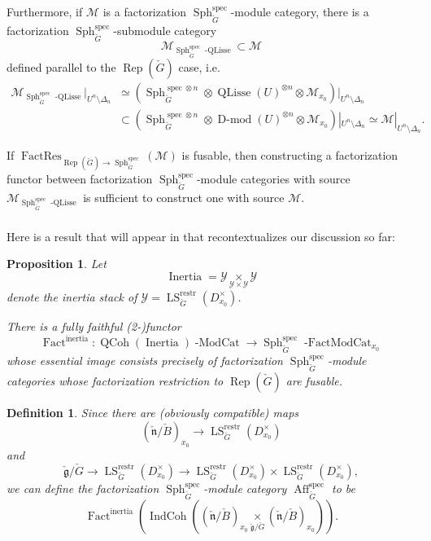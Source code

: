 \documentclass[10pt]{amsart}
\newtheorem{prop}[subsubsection]{Proposition}
\newtheorem{defn}[subsubsection]{Definition}
\theoremstyle{remark}
\newcommand{\on}[1]{\operatorname{#1}}
\newcommand{\Dmod}{\on{D-mod}}
\newcommand{\Gcheck}{\check{G}}
\newcommand{\gcheck}{\check{\mathfrak{g}}}
\newcommand{\ncheck}{\check{\mathfrak{n}}}
\newcommand{\Bcheck}{\check{B}}
\newcommand{\sssec}[1]{\subsubsection{}}
\begin{document}
\sssec{}
Furthermore, if $\mathcal{M}$ is a factorization $\on{Sph}_{\Gcheck}^{\on{spec}}$-module category, there is a factorization $\on{Sph}_{\Gcheck}^{\on{spec}}$-submodule category
$$
\mathcal{M}_{\on{Sph}_{\Gcheck}^{\on{spec}}\on{-QLisse}} \subset \mathcal{M}
$$
defined parallel to the $\on{Rep}(\Gcheck)$ case, i.e.
\begin{align}
\mathcal{M}_{\on{Sph}_{\Gcheck}^{\on{spec}}\on{-QLisse}}|_{U^n \setminus \Delta_n} &\simeq (\on{Sph}_{\Gcheck}^{\on{spec} \otimes n} \otimes \on{QLisse}(U)^{\otimes n} \otimes \mathcal{M}_{x_0})|_{U^n \setminus \Delta_n} \\
&\subset (\on{Sph}_{\Gcheck}^{\on{spec} \otimes n} \otimes \Dmod(U)^{\otimes n} \otimes \mathcal{M}_{x_0})|_{U^n \setminus \Delta_n} \simeq \mathcal{M}|_{U^n \setminus \Delta_n}.
\end{align}

If $\on{FactRes}_{\on{Rep}(\Gcheck) \to \on{Sph}_{\Gcheck}^{\on{spec}}}(\mathcal{M})$ is fusable, then constructing a factorization functor between factorization $\on{Sph}_{\Gcheck}^{\on{spec}}$-module categories with source $\mathcal{M}_{\on{Sph}_{\Gcheck}^{\on{spec}}\on{-QLisse}}$ is sufficient to construct one with source $\mathcal{M}$.

\sssec{}
Here is a result that will appear in \cite{BCG} that recontextualizes our discussion so far:

\begin{prop}
    Let
    $$
    \on{Inertia} = \mathcal{Y} \underset{\mathcal{Y} \times \mathcal{Y}}{\times} \mathcal{Y}
    $$
    denote the inertia stack of $\mathcal{Y} = \on{LS}_{\Gcheck}^{\on{restr}}(D_{x_0}^{\times})$.
    
    There is a fully faithful (2-)functor
    $$
    \on{Fact}^{\on{inertia}} : \on{QCoh}(\on{Inertia})\on{-ModCat} \longrightarrow \on{Sph}_{\Gcheck}^{\on{spec}}\on{-FactModCat}_{x_0}
    $$
    whose essential image consists precisely of factorization $\on{Sph}_{\Gcheck}^{\on{spec}}$-module categories whose factorization restriction to $\on{Rep}(\Gcheck)$ are fusable.
\end{prop}

\begin{defn}
    Since there are (obviously compatible) maps
    $$
    (\ncheck/\Bcheck)_{x_0} \longrightarrow \on{LS}_{\Gcheck}^{\on{restr}}(D_{x_0}^{\times})
    $$
    and
    $$
    \gcheck/\Gcheck \longrightarrow \on{LS}_{\Gcheck}^{\on{restr}}(D_{x_0}^{\times}) \longrightarrow \on{LS}_{\Gcheck}^{\on{restr}}(D_{x_0}^{\times}) \times \on{LS}_{\Gcheck}^{\on{restr}}(D_{x_0}^{\times}),
    $$
    we can define the factorization $\on{Sph}_{\Gcheck}^{\on{spec}}$-module category $\on{Aff}_{\Gcheck}^{\on{spec}}$ to be
    $$
    \on{Fact}^{\on{inertia}}(\on{IndCoh}((\ncheck/\Bcheck)_{x_0} \underset{\gcheck/\Gcheck}{\times} (\ncheck/\Bcheck)_{x_0})).
    $$
\end{defn}
\end{document}
